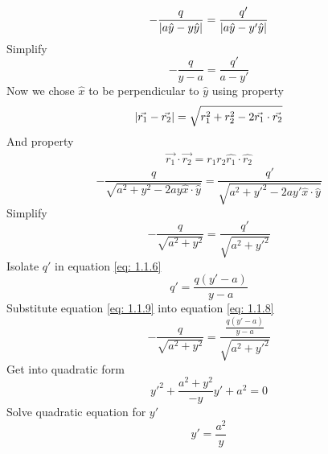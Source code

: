 \documentclass[12pt]{article}
\begin{document}
    \begin{equation} \label{eq: 1.1.5}
        -\frac{q}{\abs{a \hat{y}-y \hat{y}}} = \frac{q'}{\abs{a \hat{y} - y' \hat{y}}}
    \end{equation}
    Simplify
    \begin{equation} \label{eq: 1.1.6}
        -\frac{q}{y - a} = \frac{q'}{a - y'}
    \end{equation}   
    Now we chose $\hat{x}$ to be perpendicular to $\hat{y}$ using property
    \begin{gather*}
        \abs{\vec{r_1} - \vec{r_2}} = \sqrt{r_1^2 + r_2^2 - 2 \vec{r_1} \cdot \vec{r_2}}
    \end{gather*}
    And property
    \begin{gather*}
        \vec{r_1} \cdot \vec{r_2} = r_1 r_2 \hat{r_1} \cdot \hat{r_2}
    \end{gather*}
    \begin{equation} \label{eq: 1.1.7}
        -\frac{q}{\sqrt{a^2 + y^2 - 2 a y \hat{x} \cdot \hat{y}}} = \frac{q'}{\sqrt{a^2 + {y'}^2 - 2 a y' \hat{x} \cdot \hat{y}}}
    \end{equation}
    Simplify
    \begin{equation} \label{eq: 1.1.8}
        -\frac{q}{\sqrt{a^2 + y^2}} = \frac{q'}{\sqrt{a^2 + {y'}^2}}
    \end{equation}
    Isolate $q'$ in equation \ref{eq: 1.1.6}
    \begin{equation} \label{eq: 1.1.9}
        q' = \frac{q (y' - a)}{y - a}
    \end{equation}
    Substitute equation \ref{eq: 1.1.9} into equation \ref{eq: 1.1.8}
    \begin{equation} \label{eq: 1.1.10}
        -\frac{q}{\sqrt{a^2 + y^2}} = \frac{\frac{q (y' - a)}{y - a}}{\sqrt{a^2 + {y'}^2}}
    \end{equation}
    Get into quadratic form
    \begin{equation} \label{eq: 1.1.11}
        {y'}^2 + \frac{a^2 + y^2}{-y} y' + a^2 = 0
    \end{equation}
    Solve quadratic equation for $y'$
    \begin{equation} \label{eq: 1.1.12}
        y' = \frac{a^2}{y}
    \end{equation}
\end{document}
